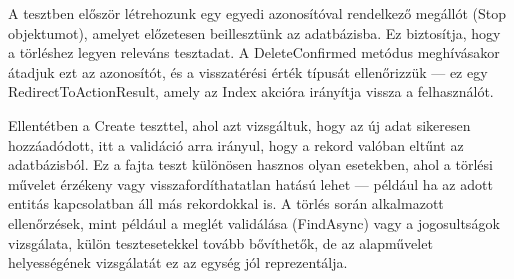 A tesztben először létrehozunk egy egyedi azonosítóval rendelkező megállót (Stop objektumot), amelyet előzetesen beillesztünk az adatbázisba. Ez biztosítja, hogy a törléshez legyen releváns tesztadat. A DeleteConfirmed metódus meghívásakor átadjuk ezt az azonosítót, és a visszatérési érték típusát ellenőrizzük — ez egy RedirectToActionResult, amely az Index akcióra irányítja vissza a felhasználót.

Ellentétben a Create teszttel, ahol azt vizsgáltuk, hogy az új adat sikeresen hozzáadódott, itt a validáció arra irányul, hogy a rekord valóban eltűnt az adatbázisból. Ez a fajta teszt különösen hasznos olyan esetekben, ahol a törlési művelet érzékeny vagy visszafordíthatatlan hatású lehet — például ha az adott entitás kapcsolatban áll más rekordokkal is. A törlés során alkalmazott ellenőrzések, mint például a meglét validálása (FindAsync) vagy a jogosultságok vizsgálata, külön tesztesetekkel tovább bővíthetők, de az alapművelet helyességének vizsgálatát ez az egység jól reprezentálja.

